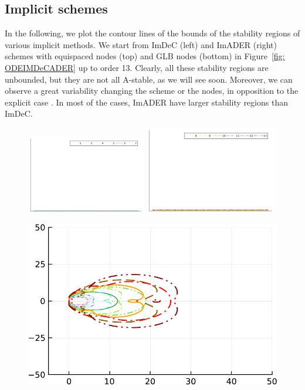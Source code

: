 \subsection{Implicit schemes}
In the following, we plot the contour lines of the bounds of the stability regions of various implicit methods. We start from ImDeC (left) and ImADER (right) schemes with equispaced nodes (top) and GLB nodes (bottom) in Figure~\ref{fig: ODEIMDeCADER} up to order 13. 
Clearly, all these stability regions are unbounded, but they are not all A-stable, as we will see soon. Moreover, we can observe a great variability changing the scheme or the nodes, in opposition to the explicit case \cite{Han_Veiga_2021}. In most of the cases, ImADER have larger stability regions than ImDeC.
\begin{figure}
	\centering
	\includegraphics[width=0.465\textwidth,trim={215 340 32 22}, clip]{pdf/odepics/colors_a-d_new_horiz_2-7_no_order.pdf}\!\!
	\includegraphics[width=0.515\textwidth,trim={179 340 30 22}, clip]{pdf/odepics/colors_a-d_new_horiz_8-13_no_order.pdf}\\
	\begin{minipage}[t]{0.32\textwidth}
		\centering
		\includegraphics[width=\textwidth, trim={0 0 0 0}, clip]{pdf/odepics/IMDeC_eq_ord13-crop.pdf}\\

\end{minipage}
\end{figure}
